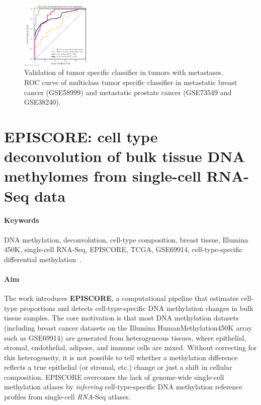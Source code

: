 \documentclass[10pt]{extarticle}
\begin{document}
\begin{figure}[H]
    \centering
    \includegraphics[width=0.3\textwidth]{Figures/Validation of tumor specific classifier in tumors with metastases.jpg} %
    \caption{Validation of tumor specific classifier in tumors with metastases. ROC curve of multiclass tumor specific classifier in
metastatic breast cancer (GSE58999) and metastatic prostate cancer (GSE73549 and GSE38240).}
    \label{fig:ROC}
\end{figure}

\section{EPISCORE: cell type deconvolution of bulk tissue DNA methylomes from single-cell RNA-Seq data}

\paragraph{Keywords}
DNA methylation, deconvolution, cell-type composition, breast tissue, Illumina 450K, single-cell RNA-Seq, EPISCORE, TCGA, GSE69914, cell-type-specific differential methylation~\cite{teschendorff2020episcore}.

\paragraph{Aim}
The work introduces \textbf{EPISCORE}, a computational pipeline that estimates cell-type proportions and detects cell-type-specific DNA methylation changes in bulk tissue samples. The core motivation is that most DNA methylation datasets (including breast cancer datasets on the Illumina HumanMethylation450K array such as GSE69914) are generated from heterogeneous tissues, where epithelial, stromal, endothelial, adipose, and immune cells are mixed. Without correcting for this heterogeneity, it is not possible to tell whether a methylation difference reflects a true epithelial (or stromal, etc.) change or just a shift in cellular composition. EPISCORE overcomes the lack of genome-wide single-cell methylation atlases by \textit{inferring} cell-type-specific DNA methylation reference profiles from single-cell \textit{RNA}-Seq atlases.
\end{document}
